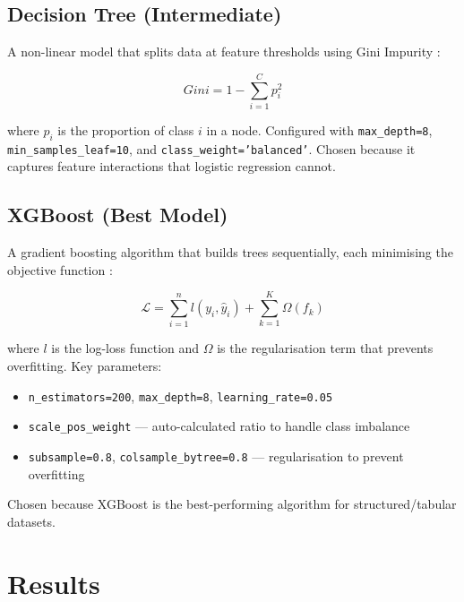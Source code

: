 \documentclass[12pt, a4paper]{article}
\begin{document}
\subsection{Decision Tree (Intermediate)}

A non-linear model that splits data at feature thresholds using Gini Impurity \cite{sklearn}:

\begin{equation}
Gini = 1 - \sum_{i=1}^{C} p_i^2
\end{equation}

where $p_i$ is the proportion of class $i$ in a node. Configured with \texttt{max\_depth=8}, \texttt{min\_samples\_leaf=10}, and \texttt{class\_weight='balanced'}. Chosen because it captures feature interactions that logistic regression cannot.

\subsection{XGBoost (Best Model)}

A gradient boosting algorithm that builds trees sequentially, each minimising the objective function \cite{xgboost}:

\begin{equation}
\mathcal{L} = \sum_{i=1}^{n} l(y_i, \hat{y}_i) + \sum_{k=1}^{K} \Omega(f_k)
\end{equation}

where $l$ is the log-loss function and $\Omega$ is the regularisation term that prevents overfitting. Key parameters:

\begin{itemize}[leftmargin=2cm]
  \item \texttt{n\_estimators=200}, \texttt{max\_depth=8}, \texttt{learning\_rate=0.05}
  \item \texttt{scale\_pos\_weight} --- auto-calculated ratio to handle class imbalance
  \item \texttt{subsample=0.8}, \texttt{colsample\_bytree=0.8} --- regularisation to prevent overfitting
\end{itemize}

Chosen because XGBoost is the best-performing algorithm for structured/tabular datasets.

\section{Results}
\end{document}
